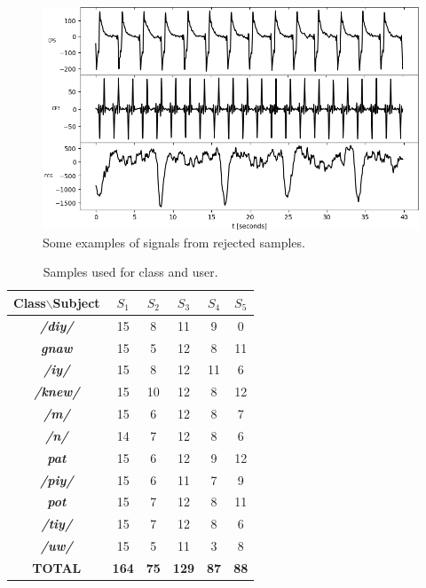\begin{figure}[h!]
	\includegraphics[scale=0.4]{Figures/Rejected_Signals.png}
	\centering
	\caption{Some examples of signals from rejected samples.}
	\label{Fig: Rejected}
\end{figure}

\begin{table}[h!]
\caption{Samples used for class and user.}
\centering
\begin{tabular}{|c|c|c|c|c|c|}\hline
	\textbf{Class$\backslash$Subject}&\textbf{$S_{1}$}&\textbf{$S_{2}$}&\textbf{$S_{3}$}&\textbf{$S_{4}$}&\textbf{$S_{5}$}\\\hline
	\textbf{\textit{/diy/}}&15&8&11&9&0\\\hline
	\textbf{\textit{gnaw}}&15&5&12&8&11\\\hline
	\textbf{\textit{/iy/}}&15&8&12&11&6\\\hline
	\textbf{\textit{/knew/}}&15&10&12&8&12\\\hline
	\textbf{\textit{/m/}}&15&6&12&8&7\\\hline
	\textbf{\textit{/n/}}&14&7&12&8&6\\\hline
	\textbf{\textit{pat}}&15&6&12&9&12\\\hline
	\textbf{\textit{/piy/}}&15&6&11&7&9\\\hline
	\textbf{\textit{pot}}&15&7&12&8&11\\\hline
	\textbf{\textit{/tiy/}}&15&7&12&8&6\\\hline
	\textbf{\textit{/uw/}}&15&5&11&3&8\\\hline
	\textbf{TOTAL}&\textbf{164}&\textbf{75}&\textbf{129}&\textbf{87}&\textbf{88}\\\hline
\end{tabular}
\label{Table: Subj_Class}
\end{table}

